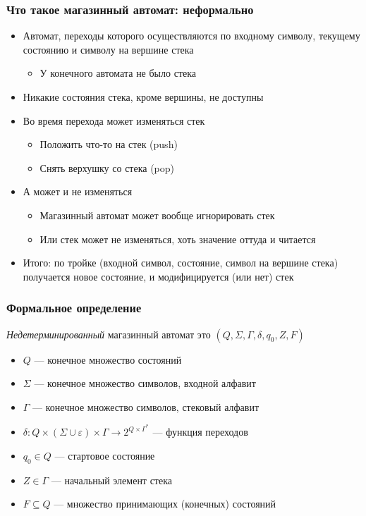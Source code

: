 \documentclass[dvipsnames]{beamer}
\begin{document}
\begin{frame}[fragile]
  \transwipe[direction=90]
  \frametitle{Что такое магазинный автомат: неформально}
\begin{itemize}
	\item Автомат, переходы которого осуществляются по входному символу, текущему состоянию и символу на вершине стека
	\begin{itemize}
		\item У конечного автомата не было стека
	\end{itemize}
	\item Никакие состояния стека, кроме вершины, не доступны
	\item Во время перехода может изменяться стек
	\begin{itemize}
		\item Положить что-то на стек (push)
		\item Снять верхушку со стека (pop)
	\end{itemize}
	\item А может и не изменяться
	\begin{itemize}
		\item Магазинный автомат может вообще игнорировать стек
		\item Или стек может не изменяться, хоть значение оттуда и читается
	\end{itemize}
	\item Итого: по тройке (входной символ, состояние, символ на вершине стека) получается новое состояние, и модифицируется (или нет) стек
\end{itemize}
\end{frame}

\begin{frame}[fragile]
  \transwipe[direction=90]
  \frametitle{Формальное определение}
  \emph{Недетерминированный} магазинный автомат это $(Q, \Sigma, \Gamma, \delta, q_0, Z, F)$
  \begin{itemize}
    \item $Q$ --- конечное множество состояний
    \item $\Sigma$ --- конечное множество символов, входной алфавит
    \item $\Gamma$ --- конечное множество символов, стековый алфавит
    \item $\delta: Q \times (\Sigma \cup \varepsilon) \times \Gamma \to 2^{Q \times \Gamma^*}$ --- функция переходов
    \item $q_0 \in Q$ --- стартовое состояние
    \item $Z \in \Gamma$ --- начальный элемент стека
    \item $F \subseteq Q$ --- множество принимающих (конечных) состояний
  \end{itemize}
\end{frame}
\end{document}
